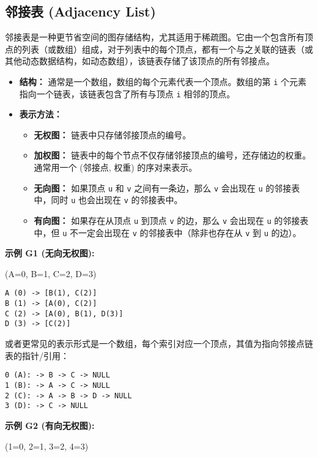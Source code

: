\subsection{邻接表 (Adjacency List)}

邻接表是一种更节省空间的图存储结构，尤其适用于稀疏图。它由一个包含所有顶点的列表（或数组）组成，对于列表中的每个顶点，都有一个与之关联的链表（或其他动态数据结构，如动态数组），该链表存储了该顶点的所有邻接点。

\begin{itemize}
	\item \textbf{结构：} 通常是一个数组，数组的每个元素代表一个顶点。数组的第 \lstinline{i} 个元素指向一个链表，该链表包含了所有与顶点 \lstinline{i} 相邻的顶点。
	\item \textbf{表示方法：}
	\begin{itemize}
		\item \textbf{无权图：} 链表中只存储邻接顶点的编号。
		\item \textbf{加权图：} 链表中的每个节点不仅存储邻接顶点的编号，还存储边的权重。通常用一个 (邻接点, 权重) 的序对来表示。
		\item \textbf{无向图：} 如果顶点 \lstinline{u} 和 \lstinline{v} 之间有一条边，那么 \lstinline{v} 会出现在 \lstinline{u} 的邻接表中，同时 \lstinline{u} 也会出现在 \lstinline{v} 的邻接表中。
		\item \textbf{有向图：} 如果存在从顶点 \lstinline{u} 到顶点 \lstinline{v} 的边，那么 \lstinline{v} 会出现在 \lstinline{u} 的邻接表中，但 \lstinline{u} 不一定会出现在 \lstinline{v} 的邻接表中（除非也存在从 \lstinline{v} 到 \lstinline{u} 的边）。
	\end{itemize}
\end{itemize}

\textbf{示例 G1 (无向无权图):}

(A=0, B=1, C=2, D=3)

\begin{lstlisting}
A (0) -> [B(1), C(2)]
B (1) -> [A(0), C(2)]
C (2) -> [A(0), B(1), D(3)]
D (3) -> [C(2)]
\end{lstlisting}
或者更常见的表示形式是一个数组，每个索引对应一个顶点，其值为指向邻接点链表的指针/引用：

\begin{lstlisting}
0 (A): -> B -> C -> NULL
1 (B): -> A -> C -> NULL
2 (C): -> A -> B -> D -> NULL
3 (D): -> C -> NULL
\end{lstlisting}
\textbf{示例 G2 (有向无权图):}

(1=0, 2=1, 3=2, 4=3)

